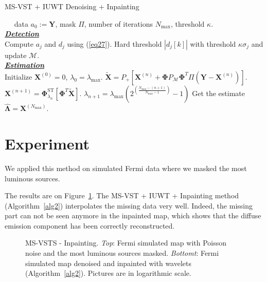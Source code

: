\begin{algorithm}
\caption{MS-VST + IUWT Denoising + Inpainting}
\label{alg2}

\begin{algorithmic}[1]
\REQUIRE $\quad$ data $a_0:=\mathbf{Y}$, mask $\Pi$, number of iterations $N_{\max}$, threshold $\kappa$.\\
\underline{\emph{\textbf{Detection}}} \\
\STATE Compute $a_j$ and $d_j$ using (\ref{eq27}).
\STATE Hard threshold $|d_j[k]|$ with threshold $\kappa \sigma_j$ and update $\mathcal{M}$.
\ENDFOR \\
\underline{\emph{\textbf{Estimation}}} \\
\STATE Initialize $\mathbf{X}^{(0)}=0$, $\lambda_{0} = \lambda_{\max}$.
\STATE $\tilde{\mathbf{X}}= P_{+}[\mathbf{ X}^{(n)} + \mathbf{ \Phi} P_{\mathcal{M}} \mathbf{ \Phi}^{T} \Pi(\mathbf{ Y} - \mathbf{ X}^{(n)})]$.
\STATE $\mathbf{X}^{(n+1)} = \mathbf{ \Phi}^\text{ST}_{\lambda_n}[\mathbf{ \Phi}^{T}\tilde{\mathbf{X}}]$.
\STATE $\lambda_{n+1} = \lambda_{\max}  (2^{(\frac{N_{\max} - (n+1)}{N_{\max} - 1})} -1)$
\ENDFOR
\STATE Get the estimate $\hat{\mathbf{\Lambda}} = \mathbf{X}^{(N_{\max})}$.

\end{algorithmic}
\end{algorithm}



\section*{Experiment}

We applied this method on simulated Fermi data where we masked the most luminous sources.

The results are on Figure~\ref{impainting}. The MS-VST + IUWT + Inpainting method (Algorithm~\ref{alg2}) interpolates the missing data very well. Indeed, the missing part can not be seen anymore in the inpainted map, which shows that the diffuse emission component  has been correctly reconstructed.


\begin{figure}[htb]
\caption{MS-VSTS - Inpainting.
\emph{Top}: Fermi simulated map with Poisson noise and the most luminous sources masked.
\emph{Bottomt}: Fermi simulated map denoised and inpainted with wavelets (Algorithm~\ref{alg2}).
Pictures are in logarithmic scale.
}
\label{impainting}
\end{figure}
